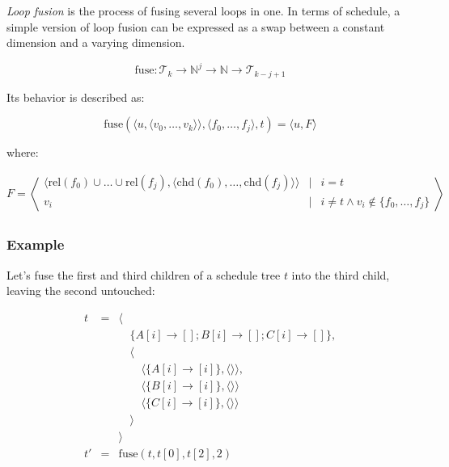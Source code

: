 \documentclass{article}
\begin{document}
\emph{Loop fusion} is the process of fusing several loops in one. In terms of
schedule, a simple version of loop fusion can be expressed as a swap between a
constant dimension and a varying dimension.

\[
    \mathrm{fuse}:  \mathcal{T}_k \rightarrow  \mathbb{N}^j \rightarrow \mathbb{N} \rightarrow  \mathcal{T}_{k - j + 1}
\]

Its behavior is described as: 

\[
    \mathrm{fuse}(\langle u, \langle v_0, \ldots, v_k\rangle \rangle, \langle f_0, \ldots, f_j\rangle, t) = \langle  u, F \rangle
\]

\noindent where:

\[
    F = \left\langle 
    \begin{array}{ccl}
         \langle \mathrm{rel}(f_0) \cup \ldots \cup \mathrm{rel}(f_j), \langle \mathrm{chd}(f_0), \ldots, \mathrm{chd}(f_j)\rangle  \rangle & \mid& i = t \\
         v_i & \mid& i \neq t \wedge  v_i \not\in \{f_0, \ldots, f_j\} \\
    \end{array}
    \right\rangle
\]

\subsubsection*{Example}

Let's fuse the first and third children of a schedule tree $t$ into the third child, leaving the second untouched:

\[
    \begin{array}{lcl}
        t &=& \langle \\
          & & \quad\{A[i] \rightarrow []; B[i] \rightarrow []; C[i] \rightarrow []  \},\\
          & & \quad\langle \\
          & & \quad\quad \langle\{ A[i] \rightarrow [i] \}, \langle\rangle\rangle,\\
          & & \quad\quad \langle\{ B[i] \rightarrow [i] \}, \langle\rangle\rangle\\
          & & \quad\quad \langle\{ C[i] \rightarrow [i] \}, \langle\rangle\rangle\\
          & & \quad\rangle \\
          & & \rangle \\
        t'&=& \mathrm{fuse}(t, t[0], t[2], 2) \\
    \end{array}
\]
\end{document}
